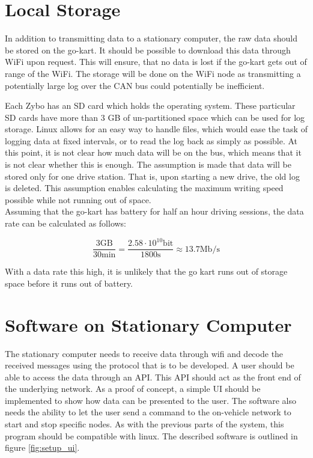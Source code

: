 
\section{Local Storage}
In addition to transmitting data to a stationary computer, the raw data should be stored on the go-kart.
It should be possible to download this data through WiFi upon request.
This will ensure, that no data is lost if the go-kart gets out of range of the WiFi.
The storage will be done on the WiFi node as transmitting a potentially large log over the CAN bus could potentially be inefficient.

Each Zybo has an SD card which holds the operating system.
These particular SD cards have more than 3 GB of un-partitioned space which can be used for log storage. 
Linux allows for an easy way to handle files, which would ease the task of logging data at fixed intervals, or to read the log back as simply as possible.
At this point, it is not clear how much data will be on the bus, which means that it is not clear whether this is enough.
The assumption is made that data will be stored only for one drive station.
That is, upon starting a new drive, the old log is deleted.
This assumption enables calculating the maximum writing speed possible while not running out of space.\\

Assuming that the go-kart has battery for half an hour driving sessions, the data rate can be calculated as follows:

\begin{equation}
	\frac{3\mathrm{GB}}{30\si{\minute}} = \frac{2.58 \cdot 10^{10} \mathrm{bit}}{1800 \si{\second}} \approx 13.7 \mathrm{Mb/s}
\end{equation}

With a data rate this high, it is unlikely that the go kart runs out of storage space before it runs out of battery.

\section{Software on Stationary Computer}
The stationary computer needs to receive data through wifi and decode the received messages using the protocol that is to be developed.
A user should be able to access the data through an API.
This API should act as the front end of the underlying network.
As a proof of concept, a simple UI should be implemented to show how data can be presented to the user.
The software also needs the ability to let the user send a command to the on-vehicle network to start and stop specific nodes.
As with the previous parts of the system, this program should be compatible with linux.
The described software is outlined in figure \ref{fig:setup_ui}.

